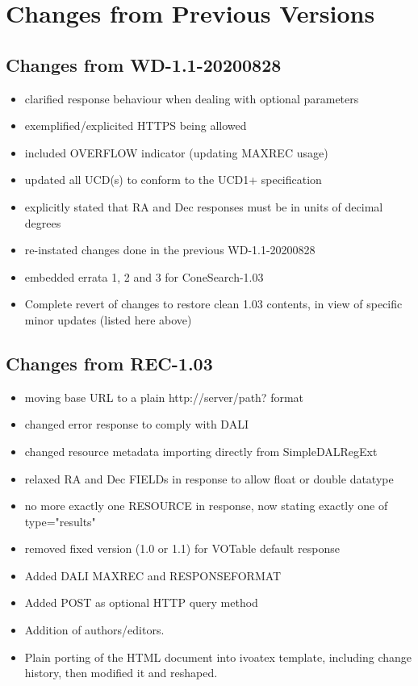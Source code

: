 \documentclass[11pt,a4paper]{ivoa}
\begin{document}
\section{Changes from Previous Versions}

\subsection*{Changes from WD-1.1-20200828}
\begin{itemize}
	\item clarified response behaviour when dealing with optional
parameters
	\item	exemplified/explicited HTTPS being allowed
	\item included OVERFLOW indicator (updating MAXREC usage)
	\item updated all UCD(s) to conform to the UCD1+ specification
	\item explicitly stated that RA and Dec responses must be
		in units of decimal degrees
	\item re-instated changes done in the previous WD-1.1-20200828
	\item embedded errata 1, 2 and 3 for ConeSearch-1.03
	\item Complete revert of changes to restore clean 1.03 contents,
		in view of specific minor updates (listed here above)
\end{itemize}

\subsection*{Changes from REC-1.03}
\label{appendix:first11changes}
\begin{itemize}
	\item moving base URL to a plain http://server/path? format
	\item changed error response to comply with DALI
	\item changed resource metadata importing directly from SimpleDALRegExt
	\item relaxed RA and Dec FIELDs in response to allow float or double datatype
	\item no more exactly one RESOURCE in response, now stating exactly one of
		type="results"
	\item removed fixed version (1.0 or 1.1) for VOTable default response
	\item Added DALI MAXREC and RESPONSEFORMAT
	\item Added POST as optional HTTP query method
	\item Addition of authors/editors.
	\item Plain porting of the HTML document into ivoatex template,
		including change history, then modified it and reshaped.
\end{itemize}
\end{document}
